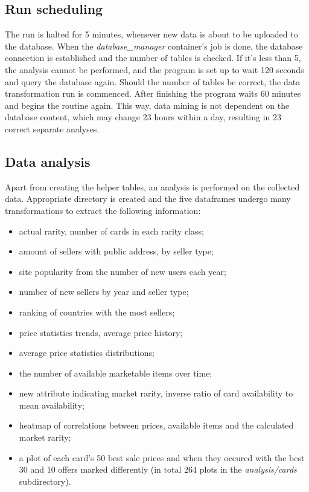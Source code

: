 \subsection{Run scheduling}
The run is halted for 5 minutes, whenever new data is about to be uploaded to the database. When the \textit{database\_manager} container's job is done, the database connection is established and the number of tables is checked. If it's less than 5, the analysis cannot be performed, and the program is set up to wait 120 seconds and query the database again. Should the number of tables be correct, the data transformation run is commenced. After finishing the program waits 60 minutes and begins the routine again. This way, data mining is not dependent on the database content, which may change 23 hours within a day, resulting in 23 correct separate analyses.

\subsection{Data analysis}
\label{ss:data_analysis}
Apart from creating the helper tables, an analysis is performed on the collected data. Appropriate directory is created and the five dataframes undergo many transformations to extract the following information:

\begin{itemize}
    \item actual rarity, number of cards in each rarity class;
    \item amount of sellers with public address, by seller type;
    \item site popularity from the number of new users each year;
    \item number of new sellers by year and seller type;
    \item ranking of countries with the most sellers;
    \item price statistics trends, average price history;
    \item average price statistics distributions;
    \item the number of available marketable items over time;
    \item new attribute indicating market rarity, inverse ratio of card availability to mean availability;
    \item heatmap of correlations between prices, available items and the calculated market rarity;
    \item a plot of each card's 50 best sale prices and when they occured with the best 30 and 10 offers marked differently (in total 264 plots in the \textit{analysis/cards} subdirectory).
\end{itemize}
